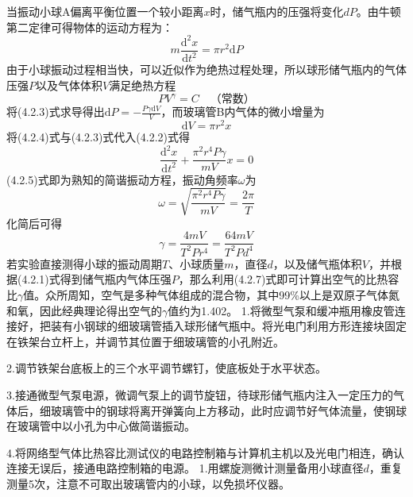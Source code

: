 当振动小球A偏离平衡位置一个较小距离$x$时，储气瓶内的压强将变化$dP$。由牛顿第二定律可得物体的运动方程为：
\begin{equation}m\frac{\mathrm d^2x}{\mathrm dt^2}=\pi r^2\mathrm dP\tag{4.2.2}\end{equation}
由于小球振动过程相当快，可以近似作为绝热过程处理，所以球形储气瓶内的气体压强$P$以及气体体积$V$满足绝热方程
\begin{equation}PV^\gamma=C\quad\text{（常数）}\tag{4.2.3}\end{equation}
将(4.2.3)式求导得出$\mathrm dP=-\frac{P\gamma\mathrm dV}{V}$，而玻璃管B内气体的微小增量为
\begin{equation}\mathrm dV=\pi r^2x\tag{4.2.4}\end{equation}
将(4.2.4)式与(4.2.3)式代入(4.2.2)式得
\begin{equation}\frac{\mathrm d^2x}{\mathrm dt^2}+\frac{\pi^2r^4P\gamma}{mV}x=0\tag{4.2.5}\end{equation}
(4.2.5)式即为熟知的简谐振动方程，振动角频率$\omega$为
\begin{equation}\omega=\sqrt{\frac{\pi^2r^4P\gamma}{mV}}=\frac{2\pi}{T}\tag{4.2.6}\end{equation}
化简后可得
\begin{equation}\gamma=\frac{4mV}{T^2Pr^4}=\frac{64mV}{T^2Pd^4}\tag{4.2.7}\end{equation}
若实验直接测得小球的振动周期$T$、小球质量$m$，直径$d$，以及储气瓶体积$V$，并根据(4.2.1)式得到储气瓶内气体压强$P$，那么利用(4.2.7)式即可计算出空气的比热容比$\gamma$值。众所周知，空气是多种气体组成的混合物，其中99\%以上是双原子气体氮和氧，因此经典理论得出空气的$\gamma$值约为1.402。
1.将微型气泵和缓冲瓶用橡皮管连接好，把装有小钢球的细玻璃管插入球形储气瓶中。将光电门利用方形连接块固定在铁架台立杆上，并调节其位置于细玻璃管的小孔附近。\par
2.调节铁架台底板上的三个水平调节螺钉，使底板处于水平状态。\par
3.接通微型气泵电源，微调气泵上的调节旋钮，待球形储气瓶内注入一定压力的气体后，细玻璃管中的钢球将离开弹簧向上方移动，此时应调节好气体流量，使钢球在玻璃管中以小孔为中心做简谐振动。\par
4.将网络型气体比热容比测试仪的电路控制箱与计算机主机以及光电门相连，确认连接无误后，接通电路控制箱的电源。
1.用螺旋测微计测量备用小球直径$d$，重复测量5次，注意不可取出玻璃管内的小球，以免损坏仪器。\par
